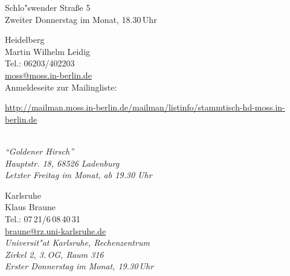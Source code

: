 \begin{multicols}{2}
\begin{roll}
{      Schlo"swender Straße 5\\
      Zweiter Donnerstag im Monat, 
      18.30\,Uhr}
%
  \item[Heidelberg]  \ \\
   Martin Wilhelm Leidig\\
   Tel.: 06203/402203 \\
   \url{moss@moss.in-berlin.de}\\
   Anmeldeseite zur Mailingliste: \\[1pt]
   \parbox{\columnwidth}{%
   \url{http://mailman.moss.in-berlin.de/mailman/listinfo/stammtisch-hd-moss.in-berlin.de}}\\[1pt]
   \emph{"`Goldener Hirsch"'\\
   Hauptstr. 18, 68526 Ladenburg\\
  Letzter Freitag im Monat, ab 19.30 Uhr}
%
  \item[Karlsruhe]  \ \\
    Klaus Braune\\
    Tel.: 07\,21/6\,08\,40\,31\\
    \url{braune@rz.uni-karlsruhe.de}\\
    \emph{Universit"at Karlsruhe, Rechenzentrum\\
      Zirkel 2, 3.\,OG, Raum 316\\
      Erster Donnerstag im Monat,
      19.30\,Uhr}


\end{roll}
\end{multicols}
